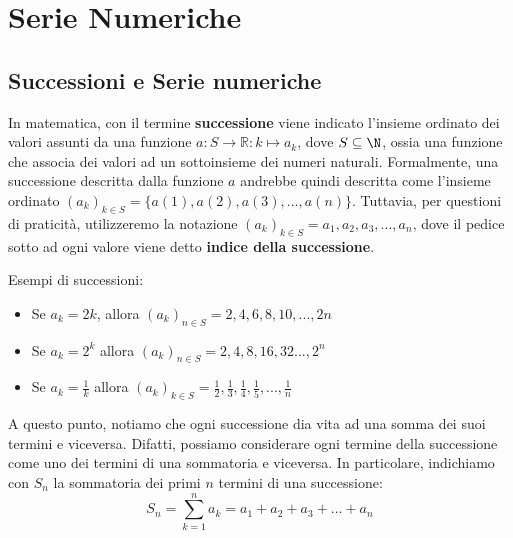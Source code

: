 \documentclass[a4paper, 12pt]{report}
\institute{\curlyquotes{\hspace{0.25mm}Sapienza} Università di Roma}
\subtitle{Appunti integrati con il libro \book}
\author{\textit{Autore}\\\authorName}
\institute{\curlyquotes{\hspace{0.25mm}Sapienza} University of Rome}
\subtitle{Lecture notes integrated with the book \book}
\author{\textit{Author}\\\authorName}
\title{\courseName}
\date{\today}
\begin{document}
    \maketitle

    {
        \hypersetup{allcolors=black}

        \romantableofcontents
    }

    \introduction



    \chapter{Serie Numeriche}
    
    \section{Successioni e Serie numeriche}
    
    In matematica, con il termine \textbf{successione} viene indicato l'insieme ordinato dei valori assunti da una funzione $a : S \to \mathbb{R} : k \mapsto a_k$, dove $S \subseteq \N$, ossia una funzione che associa dei valori ad un sottoinsieme dei numeri naturali. Formalmente, una successione descritta dalla funzione $a$ andrebbe quindi descritta come l'insieme ordinato $(a_k)_{k \in S} = \{a(1), a(2), a(3), ..., a(n)\}$. Tuttavia, per questioni di praticità, utilizzeremo la notazione $(a_k)_{k \in S} = a_1, a_2, a_3, ... , a_n$, dove il pedice sotto ad ogni valore viene detto \textbf{indice della successione}.
    
    Esempi di successioni:
    \begin{itemize}
        \item Se $a_k = 2k$, allora $(a_k)_{n \in S} = 2, 4, 6, 8, 10, ..., 2n$
        \item Se $a_k = 2^k$ allora $(a_k)_{n \in S} = 2, 4, 8, 16, 32..., 2^n$
        \item Se $a_k = \frac{1}{k}$ allora $(a_k)_{k \in S} = \frac{1}{2},\frac{1}{3},\frac{1}{4},\frac{1}{5}, ..., \frac{1}{n}$
    \end{itemize}
    
    A questo punto, notiamo che ogni successione dia vita ad una somma dei suoi termini e viceversa. Difatti, possiamo considerare ogni termine della successione come uno dei termini di una sommatoria e viceversa. In particolare, indichiamo con $S_n$ la sommatoria dei primi $n$ termini di una successione:
    \[S_n = \sum_{k = 1}^{n} a_k = a_1 + a_2 + a_3 + ... + a_n\]
    
\end{document}
